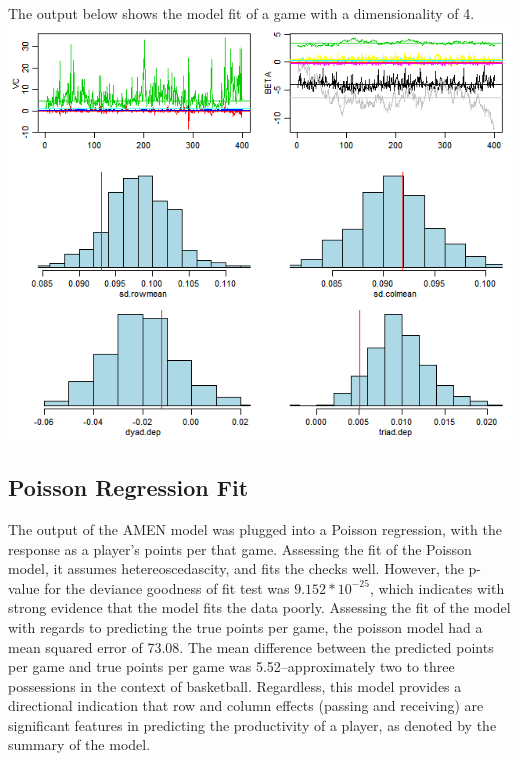 \documentclass[12pt,twoside]{dukestatscithesis}
\theoremstyle{definition}
\theoremstyle{definition}
\theoremstyle{definition}
\theoremstyle{remark}
\begin{document}
The output below shows the model fit of a game with a dimensionality of
4. \includegraphics{img/amenoutput4.png}

\subsection{Poisson Regression Fit}\label{poisson-regression-fit}

The output of the AMEN model was plugged into a Poisson regression, with
the response as a player's points per that game. Assessing the fit of
the Poisson model, it assumes hetereoscedascity, and fits the checks
well. However, the p-value for the deviance goodness of fit test was
\(9.152 * 10^{-25}\), which indicates with strong evidence that the
model fits the data poorly. Assessing the fit of the model with regards
to predicting the true points per game, the poisson model had a mean
squared error of 73.08. The mean difference between the predicted points
per game and true points per game was 5.52--approximately two to three
possessions in the context of basketball. Regardless, this model
provides a directional indication that row and column effects (passing
and receiving) are significant features in predicting the productivity
of a player, as denoted by the summary of the model.
\end{document}
